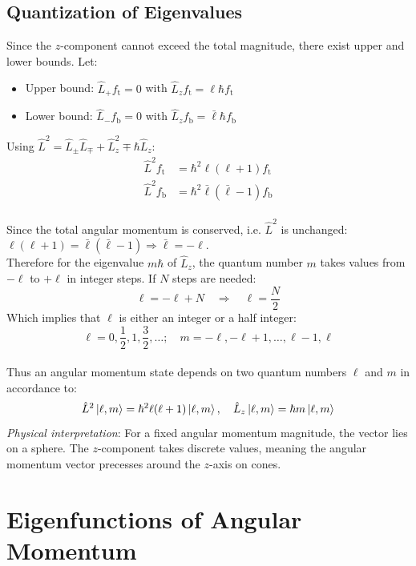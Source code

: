 \subsection{Quantization of Eigenvalues}

Since the $z$-component cannot exceed the total magnitude, there exist upper and lower bounds. Let:
\begin{itemize}
    \item Upper bound: $\hat{L}_+ f_{\text{t}} = 0$ with $\hat{L}_z f_{\text{t}} = \ell\hbar f_{\text{t}}$
    \item Lower bound: $\hat{L}_- f_{\text{b}} = 0$ with $\hat{L}_z f_{\text{b}} = \bar{\ell}\hbar f_{\text{b}}$
\end{itemize}
Using $\hat{L}^2 = \hat{L}_{\pm}\hat{L}_{\mp} + \hat{L}_z^2 \mp \hbar\hat{L}_z$:
\[\begin{aligned}
    \hat{L}^2 f_{\text{t}} &= \hbar^2\ell(\ell+1)f_{\text{t}} \\
    \hat{L}^2 f_{\text{b}} &= \hbar^2\bar{\ell}(\bar{\ell}-1)f_{\text{b}}
\end{aligned}\]\\
Since the total angular momentum is conserved, i.e. $\hat{L}^2$ is unchanged: $\ell(\ell+1) = \bar{\ell}(\bar{\ell}-1) \Rightarrow \bar{\ell} = -\ell$.\\
Therefore for the eigenvalue $m\hbar$ of $\hat{L}_z$, the quantum number $m$ takes values from $-\ell$ to $+\ell$ in integer steps. If $N$ steps are needed:
\[
    \ell = -\ell + N \quad \Rightarrow \quad \ell = \frac{N}{2}
\]
Which implies that $\ell$ is either an integer or a half integer:
\[
    \boxed{\ell = 0, \frac{1}{2}, 1, \frac{3}{2}, \ldots; \quad m = -\ell, -\ell+1, \ldots, \ell-1, \ell}
\]\\
Thus an angular momentum state depends on two quantum numbers $\ell$ and $m$ in accordance to:
\[
\hat{L}^2\ket{\ell, m} = \hbar^2\ell(\ell+1)\ket{\ell, m}, \quad
\hat{L}_z\ket{\ell, m} = \hbar m\ket{\ell, m}
\]
\emph{Physical interpretation}: For a fixed angular momentum magnitude, the vector lies on a sphere. The $z$-component takes discrete values, meaning the angular momentum vector precesses around the $z$-axis on cones.

\section{Eigenfunctions of Angular Momentum}

